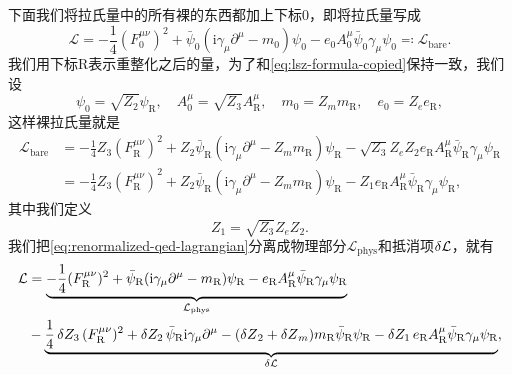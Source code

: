 \documentclass[hyperref, UTF8, a4paper]{ctexart}
\newcommand*{\ii}{\mathrm{i}}
\begin{document}
下面我们将拉氏量中的所有裸的东西都加上下标0，即将拉氏量写成
\begin{equation}
    \mathcal{L} = - \frac{1}{4} (F_0^{\mu \nu})^2 + \bar{\psi}_0 (\ii \gamma_\mu \partial^\mu - m_0) \psi_0  - e_0 A^\mu_0 \bar{\psi}_0 \gamma_\mu \psi_0 \eqqcolon \mathcal{L}_\text{bare}.
\end{equation}
我们用下标R表示重整化之后的量，为了和\eqref{eq:lsz-formula-copied}保持一致，我们设
\begin{equation}
    \psi_0 = \sqrt{Z_2} \psi_\text{R}, \quad A^\mu_0 = \sqrt{Z_3} A^\mu_\text{R}, \quad m_0 = Z_m m_\text{R}, \quad e_0 = Z_e e_\text{R}, 
\end{equation}
这样裸拉氏量就是
\begin{equation}
    \begin{aligned}
        \mathcal{L}_\text{bare} &= - \frac{1}{4} Z_3 (F_\text{R}^{\mu \nu})^2 + Z_2 \bar{\psi}_\text{R} (\ii \gamma_\mu \partial^\mu - Z_m m_\text{R}) \psi_\text{R}  - \sqrt{Z_3} Z_e Z_2 e_\text{R} A^\mu_\text{R} \bar{\psi}_\text{R} \gamma_\mu \psi_\text{R} \\
        &= - \frac{1}{4} Z_3 (F_\text{R}^{\mu \nu})^2 + Z_2 \bar{\psi}_\text{R} (\ii \gamma_\mu \partial^\mu - Z_m m_\text{R}) \psi_\text{R}  - Z_1 e_\text{R} A^\mu_\text{R} \bar{\psi}_\text{R} \gamma_\mu \psi_\text{R},
    \end{aligned}
    \label{eq:renormalized-qed-lagrangian}
\end{equation}
其中我们定义
\begin{equation}
    Z_1 = \sqrt{Z_3} Z_e Z_2 .
\end{equation}
我们把\eqref{eq:renormalized-qed-lagrangian}分离成物理部分$\mathcal{L}_\text{phys}$和抵消项$\var{\mathcal{L}}$，就有
\begin{equation}
    \begin{aligned}
        \mathcal{L} &= \underbrace{- \frac{1}{4} (F_\text{R}^{\mu \nu})^2 + \bar{\psi}_\text{R} (\ii \gamma_\mu \partial^\mu - m_\text{R}) \psi_\text{R}  - e_\text{R} A^\mu_\text{R} \bar{\psi}_\text{R} \gamma_\mu \psi_\text{R}}_{\mathcal{L}_\text{phys}} \\
        & - \underbrace{\frac{1}{4} \var{Z_3} (F_\text{R}^{\mu \nu})^2 + \var{Z_2} \bar{\psi}_\text{R} \ii \gamma_\mu \partial^\mu - (\var{Z}_2 + \var{Z}_m) m_\text{R} \bar{\psi}_\text{R} \psi_\text{R}  - \var{Z_1} e_\text{R} A^\mu_\text{R} \bar{\psi}_\text{R} \gamma_\mu \psi_\text{R}}_{\var{\mathcal{L}}},
    \end{aligned}
    \label{eq:separated-qed-lagrangian}
\end{equation}
\end{document}
